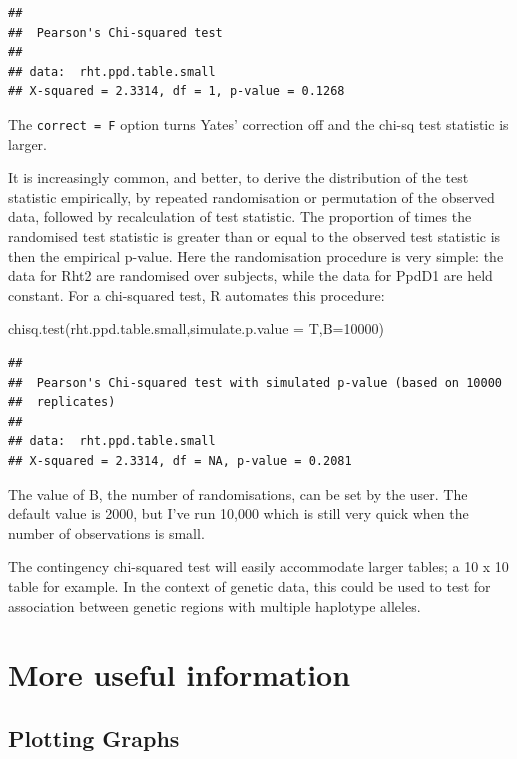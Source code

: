 \documentclass[
]{book}
\newenvironment{Shaded}{\begin{snugshade}}{\end{snugshade}}
\newcommand{\AttributeTok}[1]{\textcolor[rgb]{0.77,0.63,0.00}{#1}}
\newcommand{\DecValTok}[1]{\textcolor[rgb]{0.00,0.00,0.81}{#1}}
\newcommand{\FunctionTok}[1]{\textcolor[rgb]{0.00,0.00,0.00}{#1}}
\newcommand{\NormalTok}[1]{#1}
\begin{document}
\begin{verbatim}
## 
##  Pearson's Chi-squared test
## 
## data:  rht.ppd.table.small
## X-squared = 2.3314, df = 1, p-value = 0.1268
\end{verbatim}

The \texttt{correct\ =\ F} option turns Yates' correction off and the chi-sq test statistic is larger.

It is increasingly common, and better, to derive the distribution of the test statistic empirically, by repeated randomisation or permutation of the observed data, followed by recalculation of test statistic. The proportion of times the randomised test statistic is greater than or equal to the observed test statistic is then the empirical p-value. Here the randomisation procedure is very simple: the data for Rht2 are randomised over subjects, while the data for PpdD1 are held constant. For a chi-squared test, R automates this procedure:

\begin{Shaded}
\begin{Highlighting}[]
\FunctionTok{chisq.test}\NormalTok{(rht.ppd.table.small,}\AttributeTok{simulate.p.value =}\NormalTok{ T,}\AttributeTok{B=}\DecValTok{10000}\NormalTok{)}
\end{Highlighting}
\end{Shaded}

\begin{verbatim}
## 
##  Pearson's Chi-squared test with simulated p-value (based on 10000
##  replicates)
## 
## data:  rht.ppd.table.small
## X-squared = 2.3314, df = NA, p-value = 0.2081
\end{verbatim}

The value of B, the number of randomisations, can be set by the user. The default value is 2000, but I've run 10,000 which is still very quick when the number of observations is small.

The contingency chi-squared test will easily accommodate larger tables; a 10 x 10 table for example. In the context of genetic data, this could be used to test for association between genetic regions with multiple haplotype alleles.

\hypertarget{more-useful-information}{%
\section{More useful information}\label{more-useful-information}}

\hypertarget{plotting-graphs}{%
\subsection{Plotting Graphs}\label{plotting-graphs}}
\end{document}

